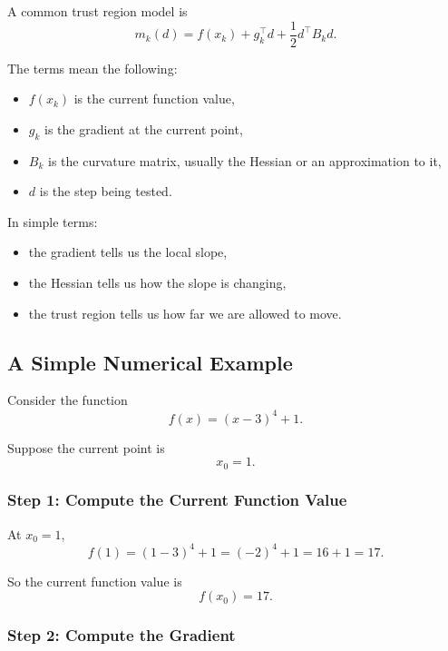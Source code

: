 \documentclass{article}
\begin{document}
A common trust region model is
\begin{equation}
m_k(d) = f(x_k) + g_k^\top d + \frac{1}{2} d^\top B_k d.
\end{equation}

The terms mean the following:
\begin{itemize}
    \item $f(x_k)$ is the current function value,
    \item $g_k$ is the gradient at the current point,
    \item $B_k$ is the curvature matrix, usually the Hessian or an approximation to it,
    \item $d$ is the step being tested.
\end{itemize}

In simple terms:
\begin{itemize}
    \item the gradient tells us the local slope,
    \item the Hessian tells us how the slope is changing,
    \item the trust region tells us how far we are allowed to move.
\end{itemize}

\subsection{A Simple Numerical Example}

Consider the function
\begin{equation}
f(x) = (x-3)^4 + 1.
\end{equation}

Suppose the current point is
\begin{equation}
x_0 = 1.
\end{equation}

\subsubsection{Step 1: Compute the Current Function Value}

At $x_0 = 1$,
\begin{equation}
f(1) = (1-3)^4 + 1 = (-2)^4 + 1 = 16 + 1 = 17.
\end{equation}

So the current function value is
\begin{equation}
f(x_0) = 17.
\end{equation}

\subsubsection{Step 2: Compute the Gradient}
\end{document}
